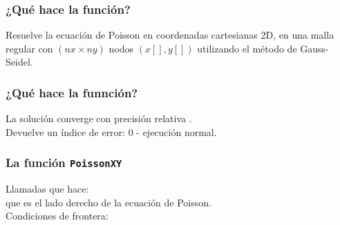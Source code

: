 \documentclass[12pt]{beamer}
\begin{document}
\begin{frame}
\frametitle{¿Qué hace la función?}
Resuelve la ecuación de Poisson en coordenadas cartesianas 2D, en una malla regular con $(nx \times ny)$ nodos $(x[ ], y[ ])$ utilizando el método de Gauss-Seidel.
\end{frame}
\begin{frame}
\frametitle{¿Qué hace la funnción?}
La solución  converge con precisión relativa .
\\
\bigskip
\pause
Devuelve un índice de error: $0$ - ejecución normal.
\end{frame}
\begin{frame}
\frametitle{La función \texttt{PoissonXY}}
Llamadas que hace: \\
 que es el lado derecho de la ecuación de Poisson.
\\
\pause 
Condiciones de frontera: \\
\\
\medskip
\pause
{}
\end{frame}
\end{document}
